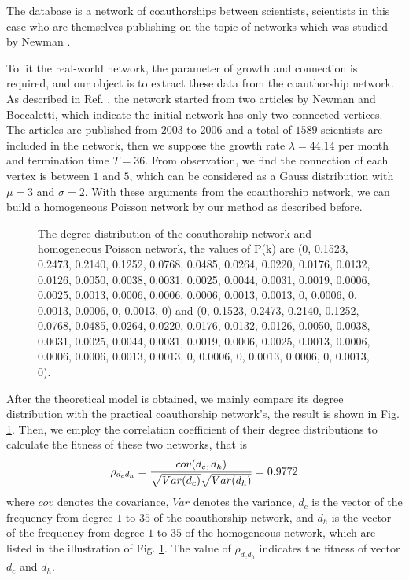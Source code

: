 \documentclass[final]{IEEEtran}
\begin{document}
The database is a network of coauthorships between scientists,
scientists in this case who are themselves publishing on the topic
of networks which was studied by Newman \cite{data}.

To fit the real-world network, the parameter of growth and
connection is required, and our object is to extract these data
from the coauthorship network. As described in Ref. \cite{data},
the network started from two articles by Newman and Boccaletti,
which indicate the initial network has only two connected
vertices. The articles are published from $2003$ to $2006$ and a
total of $1589$ scientists are included in the network, then we
suppose the growth rate $\lambda$$=$$44.14$ per month and
termination time $T$$=$$36$. From observation, we find the
connection of each vertex is between $1$ and $5$, which can be
considered as a Gauss distribution with $\mu$$=$$3$ and
$\sigma$$=$$2$. With these arguments from the coauthorship
network, we can build a homogeneous Poisson network by our method
as described before.

\begin{figure}[!htp]
\centering
\caption{\label{fx} The degree distribution of the coauthorship
network and homogeneous Poisson network, the values of P(k) are
(0, 0.1523, 0.2473, 0.2140, 0.1252, 0.0768, 0.0485, 0.0264,
0.0220, 0.0176, 0.0132, 0.0126, 0.0050, 0.0038, 0.0031, 0.0025,
0.0044, 0.0031, 0.0019, 0.0006, 0.0025, 0.0013, 0.0006, 0.0006,
0.0006, 0.0013, 0.0013, 0, 0.0006, 0, 0.0013, 0.0006, 0, 0.0013,
0)
 and (0, 0.1523, 0.2473, 0.2140, 0.1252,
0.0768, 0.0485, 0.0264, 0.0220, 0.0176, 0.0132, 0.0126, 0.0050,
0.0038, 0.0031, 0.0025, 0.0044, 0.0031, 0.0019, 0.0006, 0.0025,
0.0013, 0.0006, 0.0006, 0.0006, 0.0013, 0.0013, 0, 0.0006, 0,
0.0013, 0.0006, 0, 0.0013, 0).}
\end{figure}

After the theoretical model is obtained, we mainly compare its
degree distribution with the practical coauthorship network's, the
result is shown in Fig. \ref{fx}. Then, we employ the correlation
coefficient of their degree distributions to calculate the fitness
of these two networks, that is
\begin{equation}\footnotesize
\rho_{d_{c}d_{h}}=\frac{cov(d_{c},d_{h})}{\sqrt{Var(d_{c})}\sqrt{Var(d_{h})}}=0.9772
\end{equation}
where $cov$ denotes the covariance, $Var$ denotes the variance,
$d_{c}$ is the vector of the frequency from degree $1$ to $35$ of
the coauthorship network, and $d_{h}$ is the vector of the
frequency from degree $1$ to $35$ of the homogeneous network,
which are listed in the illustration of Fig. \ref{fx}. The value
of $\rho_{d_{c}d_{h}}$ indicates the fitness of vector $d_{c}$ and
$d_{h}$.
\end{document}
